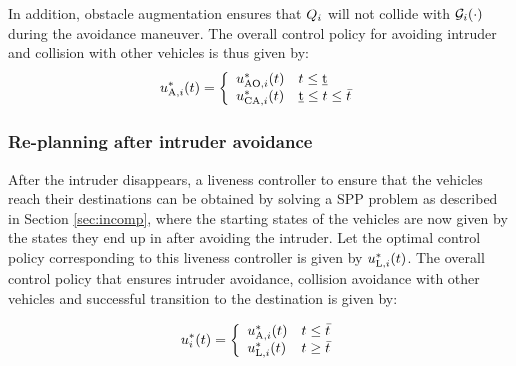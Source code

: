 In addition, obstacle augmentation ensures that $Q_i$ will not collide with $\mathcal{G}_i(\cdot)$ during the avoidance maneuver. %
The overall control policy for avoiding intruder and collision with other vehicles is thus given by:
\begin{equation*}
u^*_{\text{A}, i}(t) = 
\left \{ 
\begin{array}{ll}
u^*_{\text{AO}, i}(t) & t \leq \underbar{t}\\
u^*_{\text{CA}, i}(t) & \underbar{t} \leq t \leq \bar{t}
\end{array}
\right.
\end{equation*}

\subsubsection{Re-planning after intruder avoidance\label{sec:replan_method1}} 
After the intruder disappears, a liveness controller to ensure that the vehicles reach their destinations can be obtained by solving a SPP problem as described in Section \ref{sec:incomp}, where the starting states of the vehicles are now given by the states they end up in after avoiding the intruder.  
Let the optimal control policy corresponding to this liveness controller is given by $u^*_{\text{L}, i}(t)$. The overall control policy that ensures intruder avoidance, collision avoidance with other vehicles and successful transition to the destination is given by:

\begin{equation*}
u_i^*(t) = 
\left \{ 
\begin{array}{ll}
u^*_{\text{A}, i}(t) & t \leq \bar{t}\\
u^*_{\text{L}, i}(t) & t \geq \bar{t}
\end{array}
\right.
\end{equation*}

